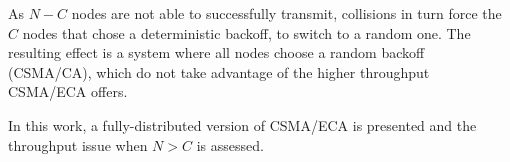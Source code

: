As $N-C$ nodes are not able to successfully transmit, collisions in turn force the $C$ nodes that chose a deterministic backoff, to switch to a random one. The resulting effect is a system where all nodes choose a random backoff (CSMA/CA), which do not take advantage of the higher throughput CSMA/ECA offers.


In this work, a fully-distributed version of CSMA/ECA is presented and the throughput issue when $N>C$ is assessed.
